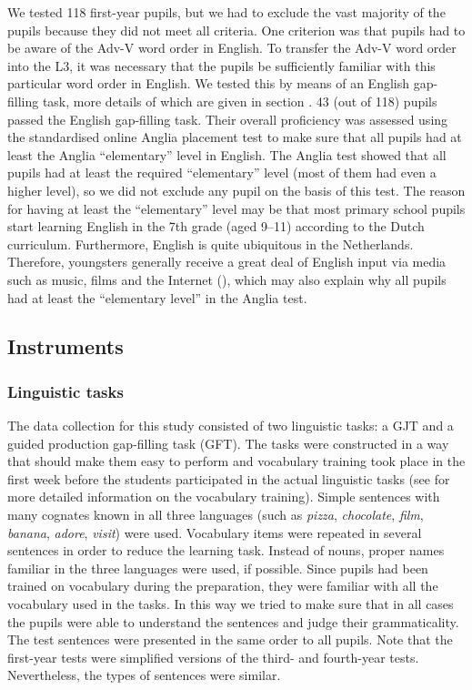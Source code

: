 \documentclass[output=paper]{langsci/langscibook}
\begin{document}
We tested 118 first-year pupils, but we had to exclude the vast majority of the pupils because they did not meet all criteria. One criterion was that pupils had to be aware of the Adv-V word order in English. To transfer the Adv-V word order into the L3, it was necessary that the pupils be sufficiently familiar with this particular word order in English. We tested this by means of an English gap-filling task, more details of which are given in section . 43 (out of 118) pupils passed the English gap-filling task. Their overall proficiency was assessed using the standardised online Anglia placement test to make sure that all pupils had at least the Anglia ``elementary'' level in English. The Anglia test showed that all pupils had at least the required ``elementary'' level (most of them had even a higher level), so we did not exclude any pupil on the basis of this test. The reason for having at least the ``elementary'' level may be that most primary school pupils start learning English in the 7th grade (aged 9–11) according to the Dutch curriculum. Furthermore, English is quite ubiquitous in the Netherlands. Therefore, youngsters generally receive a great deal of English input via media such as music, films and the Internet (\citealt{VerspoorEtAl2007, VerspoorEtAl2010}), which may also explain why all pupils had at least the ``elementary level'' in the Anglia test.

\subsection{{Instruments} }%
\label{sec:stadt:3.3}
\subsubsection{Linguistic tasks}%
\label{sec:stadt:3.3.1}

The data collection for this study consisted of two linguistic tasks: a GJT and a guided production gap-filling task (GFT). The tasks were constructed in a way that should make them easy to perform and vocabulary training took place in the first week before the students participated in the actual linguistic tasks (see  for more detailed information on the vocabulary training). Simple sentences with many cognates known in all three languages (such as \textit{pizza}, \textit{chocolate}, \textit{film}, \textit{banana}, \textit{adore}, \textit{visit}) were used. Vocabulary items were repeated in several sentences in order to reduce the learning task. Instead of nouns, proper names familiar in the three languages were used, if possible. Since pupils had been trained on vocabulary during the preparation, they were familiar with all the vocabulary used in the tasks. In this way we tried to make sure that in all cases the pupils were able to understand the sentences and judge their grammaticality. The test sentences were presented in the same order to all pupils. Note that the first-year tests were simplified versions of the third- and fourth-year tests. Nevertheless, the types of sentences were similar.
\end{document}
